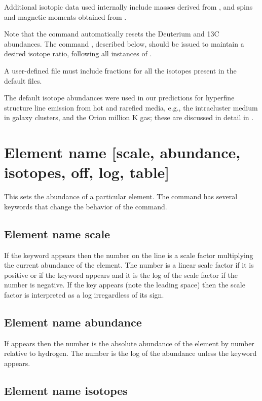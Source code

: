 Additional isotopic data used internally include masses
derived from \citet{Audi1995}, and spins and magnetic
moments obtained from \citet{Stone2005}.

Note that the command automatically resets the Deuterium
and 13C abundances.
The command , described
below, should be issued to maintain a desired isotope ratio,
following all instances of .

A user-defined file must include fractions for all
the isotopes present in the default files.

\par
The default isotope abundances were used in our predictions
for hyperfine structure line emission from hot and rarefied
media, e.g., the intracluster medium in galaxy clusters, and
the Orion million K gas; these are discussed in detail in
\citet{Chatzikos2014}.

\section{Element name [scale, abundance, isotopes, off, log, table]}

This sets the abundance of a particular element.
The command has several
keywords that change the behavior of the command.

\subsection{Element name scale}

If the keyword  appears
then the number on the line is a scale factor
multiplying the current abundance of the element.
The number is a linear
scale factor if it is positive or if the 
keyword appears and it is
the log of the scale factor if the number is negative.
If the key 
appears (note the leading space) then the scale factor
is interpreted as
a log irregardless of its sign.

\subsection{Element name abundance}

If  appears then the number is
the absolute abundance of the
element by number relative to hydrogen.
The number is the log of the
abundance unless the  keyword appears.

\subsection{Element name isotopes}

